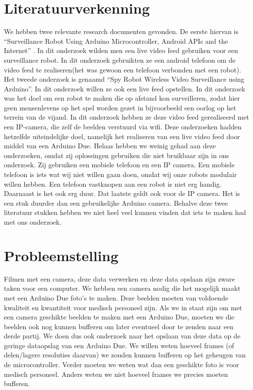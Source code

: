 \documentclass{article}
\begin{document}
\section{Literatuurverkenning}
We hebben twee relevante research documenten gevonden.
De eerste hiervan is “Surveillance Robot Using Arduino Microcontroller, Android APIs and the Internet” \citep{kulkarni2014surveillance}. In dit onderzoek wilden men een live video feed gebruiken voor een surveillance robot. In dit onderzoek gebruikten ze een android telefoon om de video feed te realiseren(het was gewoon een telefoon verbonden met een robot). 
Het tweede onderzoek is genaamd “Spy Robot Wireless Video Surveillance using Arduino”.\citep{maspy} 
In dit onderzoek willen ze ook een live feed opstellen. In dit onderzoek was het doel om een robot te maken die op afstand kon surveilleren, zodat hier geen mensenlevens op het spel worden gezet in bijvoorbeeld een oorlog op het terrein van de vijand. 
In dit onderzoek hebben ze deze video feed gerealiseerd met een IP-camera, die zelf de beelden verstuurd via wifi. 
Deze onderzoeken hadden hetzelfde uiteindelijke doel, namelijk het realiseren van een live video feed door middel van een Arduino Due. Helaas hebben we weinig gehad aan deze onderzoeken, omdat zij oplossingen gebruiken die niet bruikbaar zijn in ons onderzoek. Zij gebruiken een mobiele telefoon en een IP camera. Een mobiele telefoon is iets wat wij niet willen gaan doen, omdat wij onze robots modulair willen hebben. Een telefoon vastknopen aan een robot is niet erg handig. Daarnaast is het ook erg duur. Dat laatste geldt ook voor de IP camera. Het is een stuk duurder dan een gebruikelijke Arduino camera.
Behalve deze twee literatuur stukken hebben we niet heel veel kunnen vinden dat iets te maken had met ons onderzoek. 


\section{Probleemstelling}
Filmen met een camera, deze data verwerken en deze data opslaan zijn zware taken voor een computer. We hebben een camera nodig die het mogelijk maakt met een Arduino Due foto’s te maken. Deze beelden moeten van voldoende kwaliteit en kwantiteit voor medisch personeel zijn. Als we in staat zijn om met een camera geschikte beelden te maken met een Arduino Due, moeten we die beelden ook nog kunnen bufferen om later eventueel door te zenden naar een derde partij. We doen dus ook onderzoek naar het opslaan van deze data op de geringe dataopslag van een Arduino Due. We willen weten hoeveel frames (of delen/lagere resoluties daarvan) we zouden kunnen bufferen op het geheugen van de microcontroller. Verder moeten we weten wat dan een geschikte foto is voor medisch personeel. Anders weten we niet hoeveel frames we precies moeten bufferen. 
\end{document}
